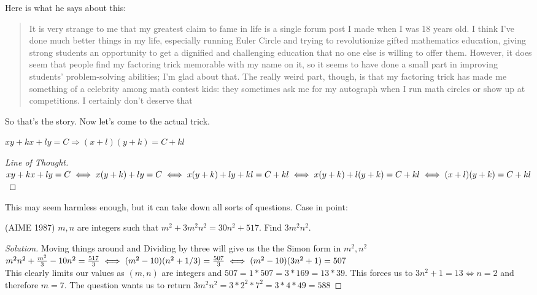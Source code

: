 Here is what he says about this:\\
\begin{quote}
    It is very strange to me that my greatest claim to fame in life is a single forum post I made when I was 18 years old. I think I’ve done much better things in my life, especially running Euler Circle and trying to revolutionize gifted mathematics education, giving strong students an opportunity to get a dignified and challenging education that no one else is willing to offer them. However, it does seem that people find my factoring trick memorable with my name on it, so it seems to have done a small part in improving students’ problem-solving abilities; I’m glad about that. The really weird part, though, is that my factoring trick has made me something of a celebrity among math contest kids: they sometimes ask me for my autograph when I run math circles or show up at competitions. I certainly don’t deserve that
\end{quote}
So that's the story. Now let's come to the actual trick.
\begin{theorem}
    [SFFT]
    $xy+kx+ly=C \Rightarrow (x+l)(y+k)=C+kl$
\end{theorem}
\begin{proof}
[Line of Thought]
    $xy+kx+ly=C\\
\iff x(y+k)+ly=C\\
\iff x(y+k)+ly+kl=C+kl\\
\iff x(y+k)+l(y+k)=C+kl\\
\iff (x+l)(y+k)=C+kl$
\end{proof}
This may seem harmless enough, but it can take down all sorts of questions. Case in point:\\
\begin{example}
(AIME 1987) $m, n$ are integers such that $m^2 + 3m^2n^2 = 30n^2 + 517$. Find $3m^2n^2$.
\end{example}
\begin{proof}
    [Solution]
    Moving things around and Dividing by three will give us the the Simon form in $m^2,n^2$\\
    $ m^2n^2+\frac{m^2}{3}-10n^2=\frac{517}{3}\\
    \iff (m^2-10)(n^2+1/3)=\frac{507}{3}\\
    \iff (m^2-10)(3n^2+1)=507$\\
    This clearly limits our values as $(m,n)$ are integers and $507=1*507=3*169=13*39$. This forces us to $3n^2+1=13 \iff n=2$ and therefore $m=7$. The question wants us to return $3m^2n^2=3*2^2*7^2=3*4*49=588$
\end{proof}
